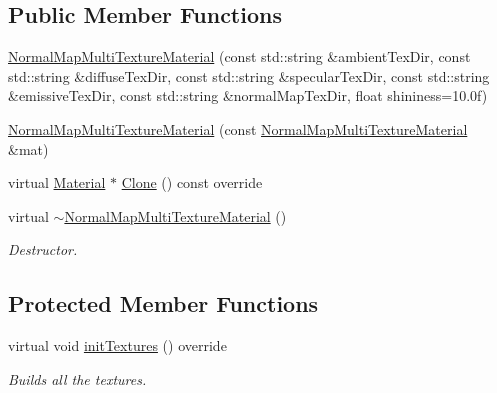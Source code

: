 \subsection*{Public Member Functions}
\begin{DoxyCompactItemize}
\item 
\mbox{\hyperlink{class_geometry_engine_1_1_geometry_material_1_1_normal_map_multi_texture_material_a76f36f54e5b2bc7fda38e22bc5665a42}{Normal\+Map\+Multi\+Texture\+Material}} (const std\+::string \&ambient\+Tex\+Dir, const std\+::string \&diffuse\+Tex\+Dir, const std\+::string \&specular\+Tex\+Dir, const std\+::string \&emissive\+Tex\+Dir, const std\+::string \&normal\+Map\+Tex\+Dir, float shininess=10.\+0f)
\item 
\mbox{\hyperlink{class_geometry_engine_1_1_geometry_material_1_1_normal_map_multi_texture_material_a4fbfa762312bb1ffdf00dd16262bb71c}{Normal\+Map\+Multi\+Texture\+Material}} (const \mbox{\hyperlink{class_geometry_engine_1_1_geometry_material_1_1_normal_map_multi_texture_material}{Normal\+Map\+Multi\+Texture\+Material}} \&mat)
\item 
virtual \mbox{\hyperlink{class_geometry_engine_1_1_geometry_material_1_1_material}{Material}} $\ast$ \mbox{\hyperlink{class_geometry_engine_1_1_geometry_material_1_1_normal_map_multi_texture_material_a38df455f7369f68ea2fc6abf31488c40}{Clone}} () const override
\item 
\mbox{\label{class_geometry_engine_1_1_geometry_material_1_1_normal_map_multi_texture_material_a7c5b04d599e7871275ec7fe9b58aed3f}} 
virtual \mbox{\hyperlink{class_geometry_engine_1_1_geometry_material_1_1_normal_map_multi_texture_material_a7c5b04d599e7871275ec7fe9b58aed3f}{$\sim$\+Normal\+Map\+Multi\+Texture\+Material}} ()
\begin{DoxyCompactList}\small\item\em Destructor. \end{DoxyCompactList}\end{DoxyCompactItemize}
\subsection*{Protected Member Functions}
\begin{DoxyCompactItemize}
\item 
\mbox{\label{class_geometry_engine_1_1_geometry_material_1_1_normal_map_multi_texture_material_a8050c34fd9abf1bd3b770df7bd1d6c11}} 
virtual void \mbox{\hyperlink{class_geometry_engine_1_1_geometry_material_1_1_normal_map_multi_texture_material_a8050c34fd9abf1bd3b770df7bd1d6c11}{init\+Textures}} () override
\begin{DoxyCompactList}\small\item\em Builds all the textures. \end{DoxyCompactList}\end{DoxyCompactItemize}
